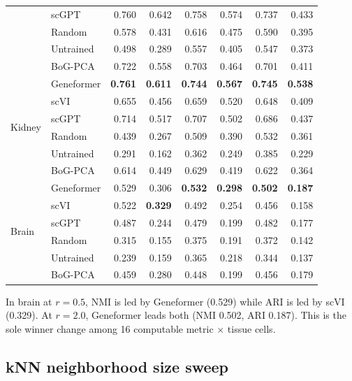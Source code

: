 \documentclass[10pt,letterpaper]{article}
\begin{document}
\begin{table}[h!]
\begin{tabular}{@{}ll rr rr rr@{}}
 & scGPT      & 0.760 & 0.642 & 0.758 & 0.574 & 0.737 & 0.433 \\
 & Random     & 0.578 & 0.431 & 0.616 & 0.475 & 0.590 & 0.395 \\
 & Untrained  & 0.498 & 0.289 & 0.557 & 0.405 & 0.547 & 0.373 \\
 & BoG-PCA    & 0.722 & 0.558 & 0.703 & 0.464 & 0.701 & 0.411 \\
\midrule
\multirow{6}{*}{Kidney}
 & Geneformer & \textbf{0.761} & \textbf{0.611} & \textbf{0.744} & \textbf{0.567} & \textbf{0.745} & \textbf{0.538} \\
 & scVI       & 0.655 & 0.456 & 0.659 & 0.520 & 0.648 & 0.409 \\
 & scGPT      & 0.714 & 0.517 & 0.707 & 0.502 & 0.686 & 0.437 \\
 & Random     & 0.439 & 0.267 & 0.509 & 0.390 & 0.532 & 0.361 \\
 & Untrained  & 0.291 & 0.162 & 0.362 & 0.249 & 0.385 & 0.229 \\
 & BoG-PCA    & 0.614 & 0.449 & 0.629 & 0.419 & 0.622 & 0.364 \\
\midrule
\multirow{6}{*}{Brain}
 & Geneformer & 0.529 & 0.306 & \textbf{0.532} & \textbf{0.298} & \textbf{0.502} & \textbf{0.187} \\
 & scVI       & 0.522 & \textbf{0.329} & 0.492 & 0.254 & 0.456 & 0.158 \\
 & scGPT      & 0.487 & 0.244 & 0.479 & 0.199 & 0.482 & 0.177 \\
 & Random     & 0.315 & 0.155 & 0.375 & 0.191 & 0.372 & 0.142 \\
 & Untrained  & 0.239 & 0.159 & 0.365 & 0.218 & 0.344 & 0.137 \\
 & BoG-PCA    & 0.459 & 0.280 & 0.448 & 0.199 & 0.456 & 0.179 \\
\bottomrule
\end{tabular}
\end{table}

In brain at $r = 0.5$, NMI is led by Geneformer (0.529) while ARI is led by scVI (0.329). At $r = 2.0$, Geneformer leads both (NMI 0.502, ARI 0.187). This is the sole winner change among 16 computable metric $\times$ tissue cells.

\subsection{kNN neighborhood size sweep}
\end{document}
